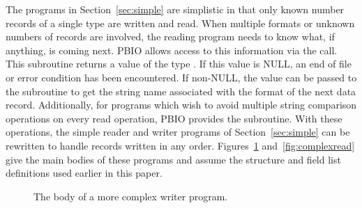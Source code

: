 The programs in Section~\ref{sec:simple} are simplistic in that only known
number records of a single type are written and read.  When multiple formats
or unknown numbers of records are involved, the reading program needs to know
what, if anything, is coming next.  PBIO allows access to this information via
the  call.  This subroutine returns a value of the
type .  If this value is NULL, an end of file or error condition has
been encountered.  If non-NULL, the value can be passed to the subroutine
 to get the string name associated with the format of
the next data record.  Additionally, for programs which wish to avoid multiple
string comparison operations on every read operation, PBIO provides the
 subroutine.  With these operations, the simple
reader and writer programs of Section~\ref{sec:simple} can be rewritten to
handle records written in any order.  Figures~\ref{fig:complexwrite}
and~\ref{fig:complexread} give the main bodies of these programs and assume the
structure and field list definitions used earlier in this paper.
\begin{figure}
\caption{The body of a more complex writer program.\label{fig:complexwrite}}
\end{figure}
